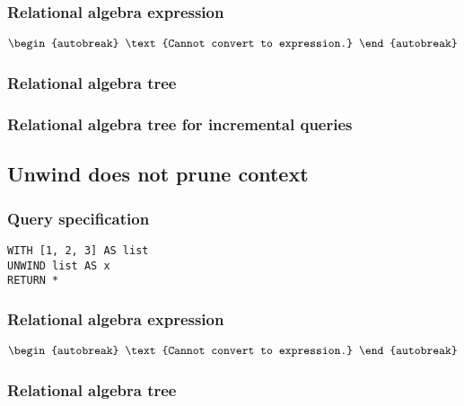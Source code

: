 \subsubsection*{Relational algebra expression}

\begin{align*}
\begin{autobreak}
\text{Cannot convert to expression.}
\end{autobreak}
\end{align*}

\subsubsection*{Relational algebra tree}


\subsubsection*{Relational algebra tree for incremental queries}


\subsection{Unwind does not prune context}

\subsubsection*{Query specification}

\begin{lstlisting}
WITH [1, 2, 3] AS list
UNWIND list AS x
RETURN *
\end{lstlisting}

\subsubsection*{Relational algebra expression}

\begin{align*}
\begin{autobreak}
\text{Cannot convert to expression.}
\end{autobreak}
\end{align*}

\subsubsection*{Relational algebra tree}

